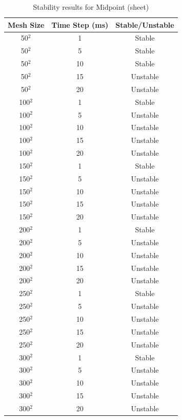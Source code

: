 \begin{table}[tp]
   \begin{minipage}{\textwidth}
      \begin{center}
         \begin{tabular}{|c|c|c|} \hline
           Mesh Size & Time Step (ms) & Stable/Unstable\\
           \hline
           50$^{2}$ & 1 & Stable\\ \hline
           50$^{2}$ & 5 & Stable\\ \hline
           50$^{2}$ & 10 & Stable\\ \hline
           50$^{2}$ & 15 & Unstable\\ \hline
           50$^{2}$ & 20 & Unstable\\ \hline
           100$^{2}$ & 1 & Stable\\ \hline
           100$^{2}$ & 5 & Unstable\\ \hline
           100$^{2}$ & 10 & Unstable\\ \hline
           100$^{2}$ & 15 & Unstable\\ \hline
           100$^{2}$ & 20 & Unstable\\ \hline           
           150$^{2}$ & 1 & Stable\\ \hline
           150$^{2}$ & 5 & Unstable\\ \hline
           150$^{2}$ & 10 & Unstable\\ \hline
           150$^{2}$ & 15 & Unstable\\ \hline
           150$^{2}$ & 20 & Unstable\\ \hline           
           200$^{2}$ & 1 & Stable\\ \hline
           200$^{2}$ & 5 & Unstable\\ \hline
           200$^{2}$ & 10 & Unstable\\ \hline
           200$^{2}$ & 15 & Unstable\\ \hline
           200$^{2}$ & 20 & Unstable\\ \hline           
           250$^{2}$ & 1 & Stable\\ \hline
           250$^{2}$ & 5 & Unstable\\ \hline
           250$^{2}$ & 10 & Unstable\\ \hline
           250$^{2}$ & 15 & Unstable\\ \hline
           250$^{2}$ & 20 & Unstable\\ \hline           
           300$^{2}$ & 1 & Stable\\ \hline
           300$^{2}$ & 5 & Unstable\\ \hline
           300$^{2}$ & 10 & Unstable\\ \hline
           300$^{2}$ & 15 & Unstable\\ \hline
           300$^{2}$ & 20 & Unstable\\ \hline
         \end{tabular}
      \end{center}
   \end{minipage}
   \caption{Stability results for Midpoint (sheet)}
   \label{tab:m stability sheet}
\end{table}

